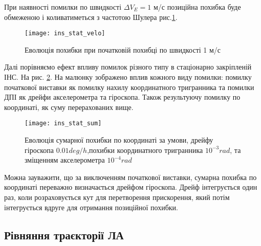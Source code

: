 При наявності помилки по швидкості $\Delta V_{E} =1$ м/с позиційна похибка буде обмеженою і коливатиметься з частотою Шулера рис.\ref{fig:ins_stat_velo}.
\begin{figure}[here]
\centering
\texttt{[image: ins\_stat\_velo]}
\caption{Еволюція похибки при початковій похибці по швидкості 1 м/с}
\label{fig:ins_stat_velo}
\end{figure}

Далі порівняємо ефект впливу помилок різного типу в стаціонарно закріпленій ІНС. На рис. \ref{fig:ins_stat_sum}.
На малюнку зображено вплив кожного виду помилки: помилку початкової виставки як помилку нахилу координатного тригранника та помилки ДПІ як дрейфи акселерометра та гіроскопа. Також результуючу помилку по координаті, як суму перерахованих вище.
\begin{figure}[here]
\centering
\texttt{[image: ins\_stat\_sum]}
\caption{Еволюція сумарної похибки по координаті за умови,
дрейфу гіроскопа   $0.01 deg/h$,похибки координатного тригранника $10^{-3} rad$, та зміщенням акселерометра $10^{-4} rad$ }\label{fig:ins_stat_sum}
\end{figure}

Можна зауважити, що за виключенням початкової виставки, сумарна похибка по координаті переважно визначається дрейфом гіроскопа. Дрейф інтегрується один раз, коли розраховується кут для перетворення прискорення, який потім інтегрується вдруге для отримання позиційної похибки.

\subsection{Рівняння траєкторії ЛА}


